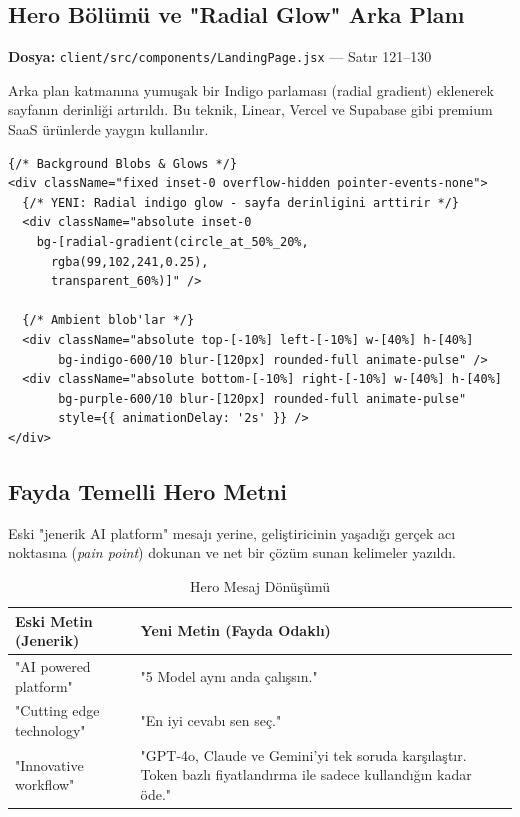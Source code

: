 \documentclass[12pt,a4paper]{article}
\begin{document}
\subsection{Hero Bölümü ve "Radial Glow" Arka Planı}

\textbf{Dosya:} \texttt{client/src/components/LandingPage.jsx} — Satır 121--130

Arka plan katmanına yumuşak bir Indigo parlaması (radial gradient) eklenerek sayfanın derinliği artırıldı. Bu teknik, Linear, Vercel ve Supabase gibi premium SaaS ürünlerde yaygın kullanılır.

\begin{lstlisting}[language=JSX, caption={Radial Glow Arka Plan Efekti - LandingPage.jsx:121}]
{/* Background Blobs & Glows */}
<div className="fixed inset-0 overflow-hidden pointer-events-none">
  {/* YENI: Radial indigo glow - sayfa derinligini arttirir */}
  <div className="absolute inset-0
    bg-[radial-gradient(circle_at_50%_20%,
      rgba(99,102,241,0.25),
      transparent_60%)]" />

  {/* Ambient blob'lar */}
  <div className="absolute top-[-10%] left-[-10%] w-[40%] h-[40%]
       bg-indigo-600/10 blur-[120px] rounded-full animate-pulse" />
  <div className="absolute bottom-[-10%] right-[-10%] w-[40%] h-[40%]
       bg-purple-600/10 blur-[120px] rounded-full animate-pulse"
       style={{ animationDelay: '2s' }} />
</div>
\end{lstlisting}

\subsection{Fayda Temelli Hero Metni}

Eski "jenerik AI platform" mesajı yerine, geliştiricinin yaşadığı gerçek acı noktasına (\textit{pain point}) dokunan ve net bir çözüm sunan kelimeler yazıldı.

\begin{table}[h!]
\centering
\begin{tabular}{p{5.5cm}p{7cm}}
\toprule
\textbf{Eski Metin (Jenerik)} & \textbf{Yeni Metin (Fayda Odaklı)} \\
\midrule
"AI powered platform" & "5 Model aynı anda çalışsın." \\
"Cutting edge technology" & "En iyi cevabı sen seç." \\
"Innovative workflow" & "GPT-4o, Claude ve Gemini'yi tek soruda karşılaştır. Token bazlı fiyatlandırma ile sadece kullandığın kadar öde." \\
\bottomrule
\end{tabular}
\caption{Hero Mesaj Dönüşümü}
\end{table}
\end{document}
